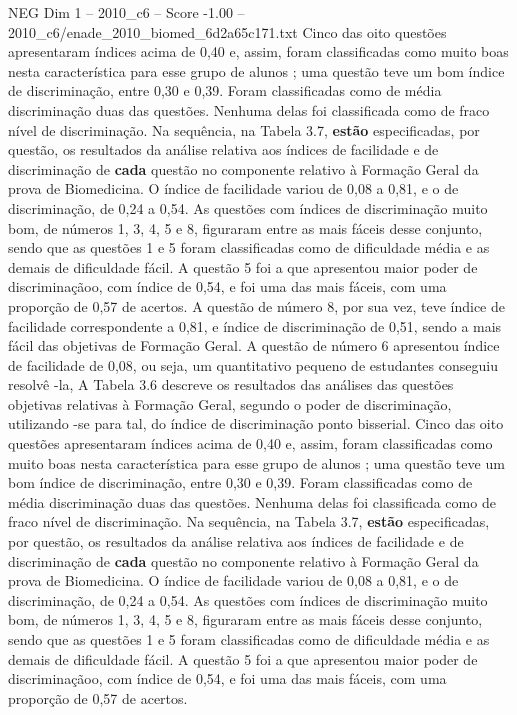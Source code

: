 \begin{textsample}{NEG Dim 1 – 2010\_c6 – Score -1.00 – 2010\_c6/enade\_2010\_biomed\_6d2a65c171.txt}
Cinco das oito questões apresentaram índices acima de 0,40 e, assim, foram classificadas como muito boas nesta característica para esse grupo de alunos ; uma questão teve um bom índice de discriminação, entre 0,30 e 0,39.
Foram classificadas como de média discriminação duas das questões.
Nenhuma delas foi classificada como de fraco nível de discriminação.
Na sequência, na Tabela 3.7, \textbf{estão} especificadas, por questão, os resultados da análise relativa aos índices de facilidade e de discriminação de \textbf{cada} questão no componente relativo à Formação Geral da prova de Biomedicina.
O índice de facilidade variou de 0,08 a 0,81, e o de discriminação, de 0,24 a 0,54.
As questões com índices de discriminação muito bom, de números 1, 3, 4, 5 e 8, figuraram entre as mais fáceis desse conjunto, sendo que as questões 1 e 5 foram classificadas como de dificuldade média e as demais de dificuldade fácil.
A questão 5 foi a que apresentou maior poder de discriminaçãoo, com índice de 0,54, e foi uma das mais fáceis, com uma proporção de 0,57 de acertos.
A questão de número 8, por sua vez, teve índice de facilidade correspondente a 0,81, e índice de discriminação de 0,51, sendo a mais fácil das objetivas de Formação Geral.
A questão de número 6 apresentou índice de facilidade de 0,08, ou seja, um quantitativo pequeno de estudantes conseguiu resolvê -la, A Tabela 3.6 descreve os resultados das análises das questões objetivas relativas à Formação Geral, segundo o poder de discriminação, utilizando -se para tal, do índice de discriminação ponto bisserial.
Cinco das oito questões apresentaram índices acima de 0,40 e, assim, foram classificadas como muito boas nesta característica para esse grupo de alunos ; uma questão teve um bom índice de discriminação, entre 0,30 e 0,39.
Foram classificadas como de média discriminação duas das questões.
Nenhuma delas foi classificada como de fraco nível de discriminação.
Na sequência, na Tabela 3.7, \textbf{estão} especificadas, por questão, os resultados da análise relativa aos índices de facilidade e de discriminação de \textbf{cada} questão no componente relativo à Formação Geral da prova de Biomedicina.
O índice de facilidade variou de 0,08 a 0,81, e o de discriminação, de 0,24 a 0,54.
As questões com índices de discriminação muito bom, de números 1, 3, 4, 5 e 8, figuraram entre as mais fáceis desse conjunto, sendo que as questões 1 e 5 foram classificadas como de dificuldade média e as demais de dificuldade fácil.
A questão 5 foi a que apresentou maior poder de discriminaçãoo, com índice de 0,54, e foi uma das mais fáceis, com uma proporção de 0,57 de acertos.

\end{textsample}
